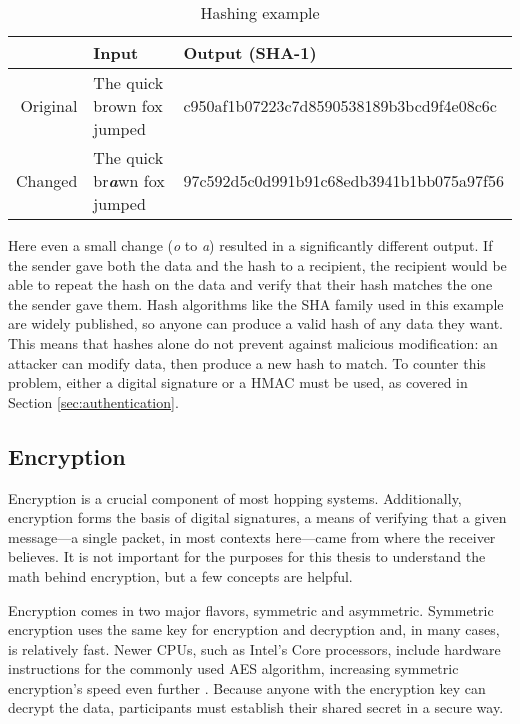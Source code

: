 \begin{table}[h]
\caption{Hashing example}
\label{tbl:hashing_example}
\centering
\begin{tabular}{r|l|l}
	& \textbf{Input}  & \textbf{Output (SHA-1)} \\
\hline
Original & The quick brown fox jumped & c950af1b07223c7d8590538189b3bcd9f4e08c6c\\
Changed & The quick br\textit{\textbf{a}}wn fox jumped & 97c592d5c0d991b91c68edb3941b1bb075a97f56
\end{tabular}
\end{table}

\par Here even a small change (\textit{o} to \textit{a}) resulted in a significantly different output. If the sender gave both the data and the hash to a recipient, the recipient would be able to repeat the hash on the data and verify that their hash matches the one the sender gave them. Hash algorithms like the \ac{SHA} family used in this example are widely published, so anyone can produce a valid hash of any data they want. This means that hashes alone do not prevent against malicious modification: an attacker can modify data, then produce a new hash to match. To counter this problem, either a digital signature or a \ac{HMAC} must be used, as covered in Section \ref{sec:authentication}.

\subsection{Encryption}
\label{sec:encryption}
\par Encryption is a crucial component of most hopping systems. Additionally, encryption forms the basis of digital signatures, a means of verifying that a given message---a single packet, in most contexts here---came from where the receiver believes. It is not important for the purposes for this thesis to understand the math behind encryption, but a few concepts are helpful.

\par Encryption comes in two major flavors, symmetric and asymmetric. Symmetric encryption uses the same key for encryption and decryption and, in many cases, is relatively fast. Newer \acsp{CPU}, such as Intel's Core processors, include hardware instructions for the commonly used \ac{AES} algorithm, increasing symmetric encryption's speed even further \cite{IntelAES}. Because anyone with the encryption key can decrypt the data, participants must establish their shared secret in a secure way.

